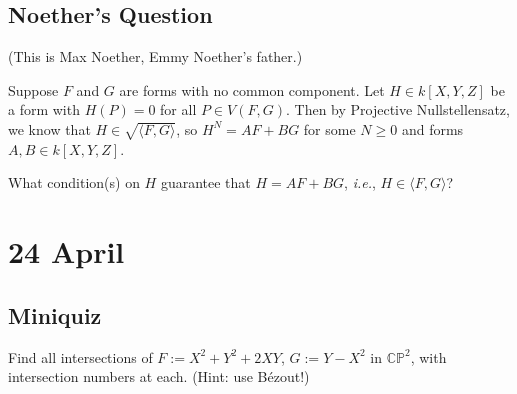 \documentclass[12pt]{article}
\newcommand{\ita}[1]{\textit{#1}}
\newcommand{\vbrack}[1]{\langle #1\rangle}
\theoremstyle{definition}
\begin{document}
\subsection{Noether's Question}
(This is Max Noether, Emmy Noether's father.)

Suppose $F$ and $G$ are forms with no common component. Let $H\in k[X,Y,Z]$ be a form with $H(P)=0$ for all $P\in V(F,G)$. Then by Projective Nullstellensatz, we know that $H\in\sqrt{\vbrack{F,G}}$, so $H^N=AF+BG$ for some $N\geq0$ and forms $A,B\in k[X,Y,Z]$. 

What condition(s) on $H$ guarantee that $H=AF+BG$, \ita{i.e.}, $H\in\vbrack{F,G}$?
\section{24 April}
\subsection{Miniquiz}
Find all intersections of $F:=X^2+Y^2+2XY$, $G:=Y-X^2$ in $\mathbb{CP}^2$, with intersection numbers at each. (Hint: use B\'ezout!)
\end{document}
